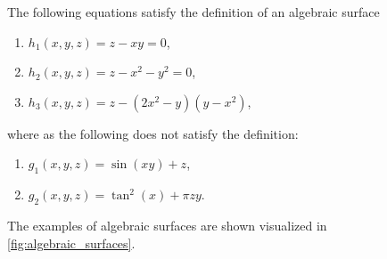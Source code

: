 \documentclass{article}
\begin{document}
\begin{example}
    \label{exmpl:algebraic_surfaces}
    The following equations satisfy the definition of an algebraic surface
    \begin{enumerate}
        \item $h_1(x, y, z) = z - xy = 0$,
        \item $h_2(x, y, z) = z - x^2 - y^2 = 0$,
        \item $h_3(x, y, z) = z - (2x^2-y)(y-x^2)$,
    \end{enumerate}
    where as the following does not satisfy the definition:
    \begin{enumerate}
        \item $g_1(x, y, z) = \sin(xy) + z$,
        \item $g_2(x, y, z) = \tan^2(x) + \pi zy$.
    \end{enumerate}
    The examples of algebraic surfaces are shown visualized in
    \cref{fig:algebraic_surfaces}.


\end{example}
\end{document}
